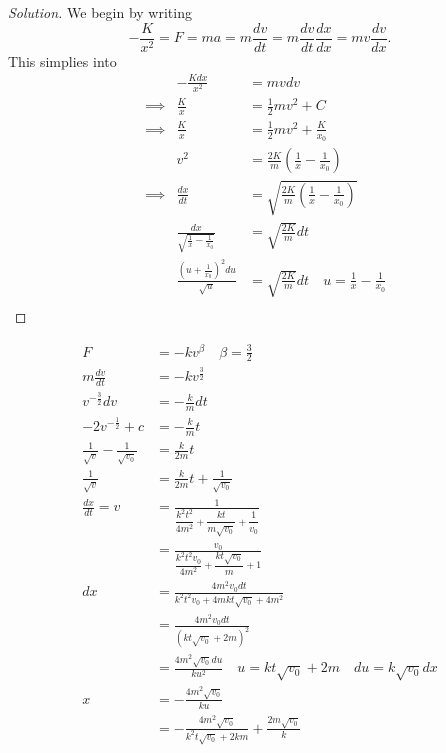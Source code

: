 \documentclass{article}
\begin{document}
\begin{proof}[Solution]
We begin by writing
\[ -\frac{K}{x^2} = F = ma = m \frac{dv}{dt} = m \frac{dv}{dt}
\frac{dx}{dx} = m v \frac{dv}{dx}. \]
This simplies into
\[ \begin{aligned}
&& -\frac{Kdx}{x^2} &= mvdv \\
&\implies& \frac{K}{x} &= \frac{1}{2}mv^2 + C \\
&\implies& \frac{K}{x} &= \frac{1}{2}mv^2 + \frac{K}{x_0} \\
&& v^2 &= \frac{2K}{m}\left(\frac{1}{x} - \frac{1}{x_0}\right) \\
&\implies& \frac{dx}{dt} &= \sqrt{\frac{2K}{m}\left(\frac{1}{x} -
\frac{1}{x_0}\right)} \\
&& \frac{dx}{\sqrt{\frac{1}{x} - \frac{1}{x_0}}} &= \sqrt{\frac{2K}{m}}
dt \\
&& \frac{\left(u + \frac{1}{x_0}\right)^2 du}{\sqrt{u}} &=
\sqrt{\frac{2K}{m}} dt \quad u = \frac{1}{x} - \frac{1}{x_0} \\
\end{aligned} \]
\end{proof}

\newpage

\[ \begin{aligned}
F &= -kv^\beta \quad \beta = \frac{3}{2} \\
m \frac{dv}{dt} &= -k v^{\frac{3}{2}} \\
v^{-\frac{3}{2}} dv &= -\frac{k}{m} dt \\
-2v^{-\frac{1}{2}} + c &= -\frac{k}{m}t \\
\frac{1}{\sqrt{v}} - \frac{1}{\sqrt{v_0}} &= \frac{k}{2m} t \\
\frac{1}{\sqrt{v}} &= \frac{k}{2m} t + \frac{1}{\sqrt{v_0}} \\
\frac{dx}{dt} = v &= \frac{1}{\dfrac{k^2 t^2}{4m^2} +
\dfrac{kt}{m\sqrt{v_0}} + \dfrac{1}{v_0}} \\
&= \frac{v_0}{\dfrac{k^2t^2v_0}{4m^2} + \dfrac{kt\sqrt{v_0}}{m} + 1} \\
dx &= \frac{4m^2 v_0 dt}{k^2 t^2 v_0 + 4mkt \sqrt{v_0} + 4m^2} \\
&= \frac{4m^2 v_0 dt}{\left(kt \sqrt{v_0} + 2m\right)^2} \\
&= \frac{4m^2 \sqrt{v_0} du}{k u^2} \quad u = kt\sqrt{v_0} + 2m \quad du
= k \sqrt{v_0} dx \\
x &= -\frac{4m^2 \sqrt{v_0}}{ku} \\
&= -\frac{4m^2\sqrt{v_0}}{k^2 t\sqrt{v_0} + 2km} +
\frac{2m\sqrt{v_0}}{k} \\
\end{aligned} \]
\end{document}
